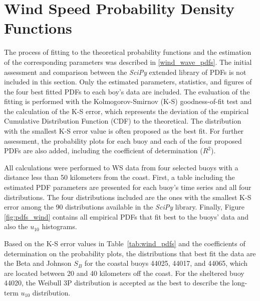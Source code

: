 \section{Wind Speed Probability Density Functions}


The process of fitting to the theoretical probability functions and the estimation of the corresponding parameters was described in \ref{wind_wave_pdfs}. The initial assessment and comparison between the \emph{SciPy} extended library of PDFs is not included in this section. Only the estimated parameters, statistics, and figures of the four best fitted PDFs to each boy's data are included. The evaluation of the fitting is performed with the Kolmogorov-Smirnov (K-S) goodness-of-fit test and the calculation of the K-S error, which represents the deviation of the empirical Cumulative Distribution Function (CDF) to the theoretical. The distribution with the smallest K-S error value is often proposed as the best fit. For further assessment, the probability plots for each buoy and each of the four proposed PDFs are also added, including the coefficient of determination ($R^{2}$). 

All calculations were performed to WS data from four selected buoys with a distance less than 50 kilometers from the coast. First, a table including the estimated PDF parameters are presented for each buoy's time series and all four distributions. The four distributions included are the ones with the smallest K-S error among the 90 distributions available in the \emph{SciPy} library. Finally, Figure \ref{fig:pdfs_wind} contains all empirical PDFs that fit best to the buoys' data and also the $u_{10}$ histograms.

Based on the K-S error values in Table~\ref{tab:wind_pdfs} and the coefficients of determination on the probability plots, the distributions that best fit the data are the Beta and Johnson $S_{B}$ for the coastal buoys 44025, 44017, and 44065, which are located between 20 and 40 kilometers off the coast. For the sheltered buoy 44020, the Weibull 3P distribution is accepted as the best to describe the long-term $u_{10}$ distribution.


